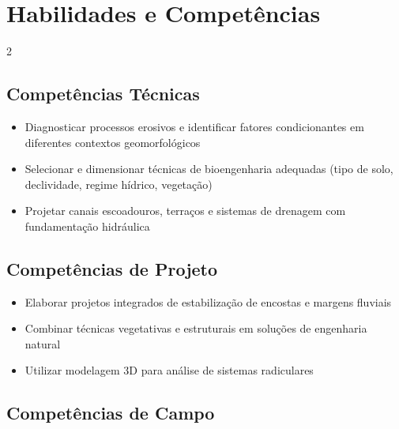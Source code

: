 \documentclass[11pt,a4paper]{article}
\begin{document}
\section*{Habilidades e Competências}

\begin{multicols}{2}

\subsection*{Competências Técnicas}

\begin{itemize}

\item Diagnosticar processos erosivos e identificar fatores condicionantes em diferentes contextos geomorfológicos

\item Selecionar e dimensionar técnicas de bioengenharia adequadas (tipo de solo, declividade, regime hídrico, vegetação)

\item Projetar canais escoadouros, terraços e sistemas de drenagem com fundamentação hidráulica

\end{itemize}

\subsection*{Competências de Projeto}

\begin{itemize}

\item Elaborar projetos integrados de estabilização de encostas e margens fluviais

\item Combinar técnicas vegetativas e estruturais em soluções de engenharia natural

\item Utilizar modelagem 3D para análise de sistemas radiculares

\end{itemize}

\columnbreak

\subsection*{Competências de Campo}

\begin{itemize}


\end{itemize}
\end{multicols}
\end{document}
